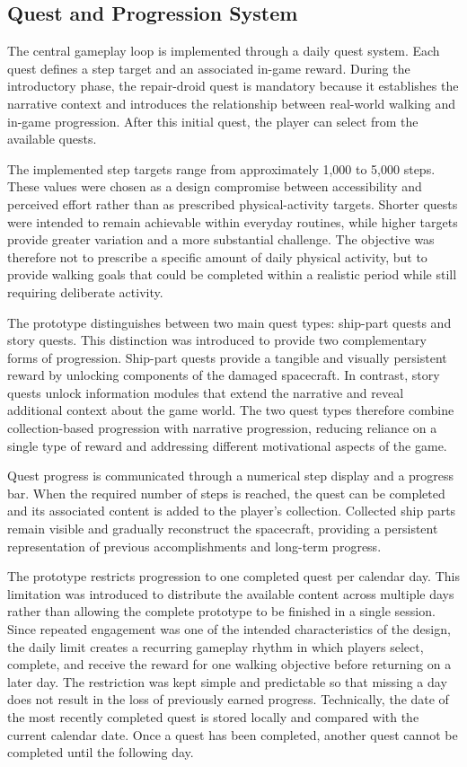 \subsection{Quest and Progression System}

The central gameplay loop is implemented through a daily quest system. Each quest defines a step target and an associated in-game reward. During the introductory phase, the repair-droid quest is mandatory because it establishes the narrative context and introduces the relationship between real-world walking and in-game progression. After this initial quest, the player can select from the available quests.

The implemented step targets range from approximately 1,000 to 5,000 steps. These values were chosen as a design compromise between accessibility and perceived effort rather than as prescribed physical-activity targets. Shorter quests were intended to remain achievable within everyday routines, while higher targets provide greater variation and a more substantial challenge. The objective was therefore not to prescribe a specific amount of daily physical activity, but to provide walking goals that could be completed within a realistic period while still requiring deliberate activity.

The prototype distinguishes between two main quest types: ship-part quests and story quests. This distinction was introduced to provide two complementary forms of progression. Ship-part quests provide a tangible and visually persistent reward by unlocking components of the damaged spacecraft. In contrast, story quests unlock information modules that extend the narrative and reveal additional context about the game world. The two quest types therefore combine collection-based progression with narrative progression, reducing reliance on a single type of reward and addressing different motivational aspects of the game.

Quest progress is communicated through a numerical step display and a progress bar. When the required number of steps is reached, the quest can be completed and its associated content is added to the player's collection. Collected ship parts remain visible and gradually reconstruct the spacecraft, providing a persistent representation of previous accomplishments and long-term progress.

The prototype restricts progression to one completed quest per calendar day. This limitation was introduced to distribute the available content across multiple days rather than allowing the complete prototype to be finished in a single session. Since repeated engagement was one of the intended characteristics of the design, the daily limit creates a recurring gameplay rhythm in which players select, complete, and receive the reward for one walking objective before returning on a later day. The restriction was kept simple and predictable so that missing a day does not result in the loss of previously earned progress. Technically, the date of the most recently completed quest is stored locally and compared with the current calendar date. Once a quest has been completed, another quest cannot be completed until the following day.
